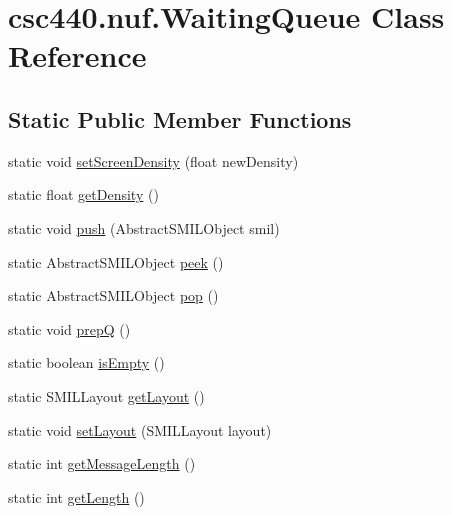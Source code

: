 \hypertarget{classcsc440_1_1nuf_1_1_waiting_queue}{\section{csc440.\-nuf.\-Waiting\-Queue Class Reference}
\label{classcsc440_1_1nuf_1_1_waiting_queue}
}
\subsection*{Static Public Member Functions}
\begin{DoxyCompactItemize}
\item 
static void \hyperlink{classcsc440_1_1nuf_1_1_waiting_queue_ae92237ad5f78ecae6df25064fa060076}{set\-Screen\-Density} (float new\-Density)
\item 
static float \hyperlink{classcsc440_1_1nuf_1_1_waiting_queue_aa0df75774f0678ef2e387dd46e467e59}{get\-Density} ()
\item 
static void \hyperlink{classcsc440_1_1nuf_1_1_waiting_queue_a98723a43fc41b33c625b6bc89f316daa}{push} (Abstract\-S\-M\-I\-L\-Object smil)
\item 
static Abstract\-S\-M\-I\-L\-Object \hyperlink{classcsc440_1_1nuf_1_1_waiting_queue_a5853f4f4288ee80584dac9d0805f058d}{peek} ()
\item 
static Abstract\-S\-M\-I\-L\-Object \hyperlink{classcsc440_1_1nuf_1_1_waiting_queue_aa733f738402b4ed414e66fbe65be3654}{pop} ()
\item 
static void \hyperlink{classcsc440_1_1nuf_1_1_waiting_queue_add84a726026626b52f9c0722c1ba5440}{prep\-Q} ()
\item 
static boolean \hyperlink{classcsc440_1_1nuf_1_1_waiting_queue_a260533a2fb28363d13793ccd1ccb2268}{is\-Empty} ()
\item 
static S\-M\-I\-L\-Layout \hyperlink{classcsc440_1_1nuf_1_1_waiting_queue_af3ffba3dc502336574e7538b22d734d0}{get\-Layout} ()
\item 
static void \hyperlink{classcsc440_1_1nuf_1_1_waiting_queue_ac0eebf9ce1ffdffc555d394ff6c1d62c}{set\-Layout} (S\-M\-I\-L\-Layout layout)
\item 
static int \hyperlink{classcsc440_1_1nuf_1_1_waiting_queue_ac136b1f6e6ba8e78b592bfb98ee1e812}{get\-Message\-Length} ()
\item 
static int \hyperlink{classcsc440_1_1nuf_1_1_waiting_queue_a02dea3c8c7be5619af03f518a21186f2}{get\-Length} ()
\end{DoxyCompactItemize}


